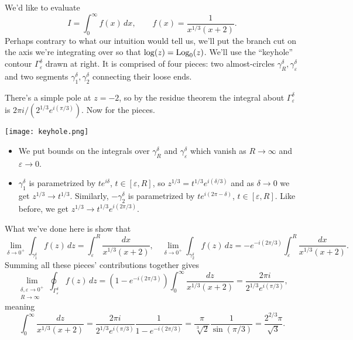 \documentclass[../m136main.tex]{subfiles}
\begin{document}
\begin{example}[A keyhole]
    \parbox{0.62\textwidth}{
        We'd like to evaluate
        \[ I = \int_{0}^{\infty} f(x) \,dx, \qquad f(x) = \frac{1}{x^{1 / 3}(x+2)}. \]
        Perhaps contrary to what our intuition would tell us, we'll put the branch cut on the axis we're integrating over so that $\log(z) = \operatorname{Log}_0(z)$.
        We'll use the ``keyhole'' contour $\Gamma_\varepsilon^\delta$ drawn at right.
        It is comprised of four pieces: two almost-circles $\gamma_R^\delta, \gamma_\varepsilon^\delta$ and two segments $\gamma_1^\delta, \gamma_2^\delta$ connecting their loose ends.
        \vspace{6pt}

        There's a simple pole at $z = -2$, so by the residue theorem the integral about $\Gamma_\varepsilon^\delta$ is $2\pi i / (2^{1 / 3} e^{i(\pi / 3)})$.
        Now for the pieces.
    }\parbox{0.38\textwidth}{
        \quad\;
        \texttt{[image: keyhole.png]}
    }

    \begin{itemize}[topsep=0pt]
        \item We put bounds on the integrals over $\gamma_R^\delta$ and $\gamma_\varepsilon^\delta$ which vanish as $R \to \infty$ and $\varepsilon \to 0$.
        
        \item $\gamma_1^\delta$ is parametrized by $t e^{i\delta}$, $t \in [\varepsilon, R]$, so $z^{1 / 3} = t^{1 / 3} e^{i(\delta / 3)}$ and as $\delta \to 0$ we get $z^{1 / 3} \to t^{1 / 3}$.
        Similarly, $-\gamma_2^\delta$ is parametrized by $te^{i(2\pi - \delta)}$, $t \in [\varepsilon, R]$.
        Like before, we get $z^{1 / 3} \to t^{1 / 3} e^{i(2\pi / 3)}$.
    \end{itemize}
    What we've done here is show that
    \[ \lim_{\delta \to 0^+} \int_{\gamma_1^{\delta}}^{} f(z) \,dz = \int_{\varepsilon}^{R} \frac{dx}{x^{1 / 3}(x+2)}, \quad \lim_{\delta \to 0^+} \int_{\gamma_2^{\delta}}^{} f(z) \,dz = -e^{-i (2\pi / 3)} \int_{\varepsilon}^{R} \frac{dx}{x^{1 / 3}(x+2)}. \]
    Summing all these pieces' contributions together gives
    \[ \lim_{\substack{\delta,\varepsilon \to 0^{+} \\ R \to \infty}} \oint_{\Gamma_\varepsilon^\delta} f(z) \,dz = (1 - e^{-i (2\pi / 3)}) \int_{0}^{\infty} \frac{dz}{x^{1 / 3} (x+2)} = \frac{2\pi i}{2^{1 / 3} e^{i(\pi / 3)}}, \]
    meaning
    \[ \int_{0}^{\infty} \frac{dz}{x^{1 / 3} (x+2)} = \frac{2\pi i}{2^{1 / 3} e^{i(\pi / 3)}} \frac{1}{1 - e^{-i(2\pi / 3)}} = \frac{\pi}{\sqrt[3]{2}} \frac{1}{\sin(\pi / 3)} = \frac{2^{2 / 3} \pi}{\sqrt{3}}. \]
\end{example}
\end{document}
